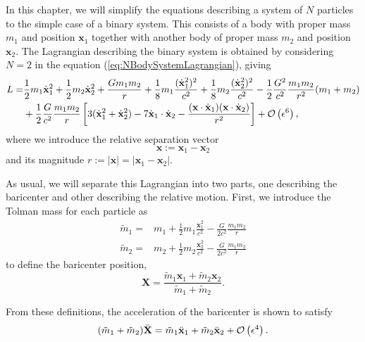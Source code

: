 In this chapter, we will simplify the equations describing a system of $N$ particles to the simple case of a binary system. This consists of a body with proper mass $m_1$ and position $\textbf{x}_1$ together with another body of proper mass $m_2$ and position $\textbf{x}_2$. The Lagrangian describing the binary system is obtained by considering $N=2$ in the equation (\ref{eq:NBodySystemLagrangian}), giving 
\begin{align}
L = &\frac{1}{2} m_1 \dot{\textbf{x}}_1^2 + \frac{1}{2} m_2 \dot{\textbf{x}}_2^2 + \frac{G m_1 m_2}{r} + \frac{1}{8} m_1 \frac{(\dot{\textbf{x}}_1^2)^2}{c^2} + \frac{1}{8} m_2 \frac{(\dot{\textbf{x}}_2^2)^2}{c^2} - \frac{1}{2} \frac{G^2}{c^2} \frac{m_1 m _2}{r^2} (m_1 + m_2) \notag \\
& + \frac{1}{2} \frac{G}{c^2} \frac{m_1 m_2}{r} \left[ 3 (\dot{\textbf{x}}_1^2+ \dot{\textbf{x}}_2^2) - 7 \dot{\textbf{x}}_1 \cdot \dot{\textbf{x}}_2 - \frac{(\textbf{x} \cdot \dot{\textbf{x}}_1) (\textbf{x} \cdot \dot{\textbf{x}}_2)}{r^2} \right]  + {\mathcal{O}} \left( \epsilon^6 \right), \label{eq:PN2BodyLagrangian1}
\end{align}
where we introduce the relative separation vector 
\begin{equation}
\textbf{x} := \textbf{x}_1 - \textbf{x}_2 \label{eq:PN2BodyRelativePosition}
\end{equation}
and its magnitude $r := \left| \textbf{x} \right| = \left| \textbf{x}_1 - \textbf{x}_2 \right|  $.

As usual, we will separate this Lagrangian into two parts, one describing the baricenter and other describing the relative motion. First, we introduce the Tolman mass for each particle as
\begin{align}
\tilde{m}_1 = & m_1 + \frac{1}{2} m_1 \frac{\dot{\textbf{x}}_1^2}{c^2} - \frac{G}{2c^2} \frac{m_1 m_2}{r} \\
\tilde{m}_2 = & m_2 + \frac{1}{2} m_2 \frac{\dot{\textbf{x}}_2^2}{c^2} - \frac{G}{2c^2} \frac{m_1 m_2}{r} 
\end{align}
to define the baricenter position,
\begin{equation}
\textbf{X} = \frac{\tilde{m}_1 \textbf{x}_1 + \tilde{m}_2 \textbf{x}_2}{\tilde{m}_1 + \tilde{m}_2}. \label{eq:PN2BodyBaricenter}
\end{equation}

From these definitions, the acceleration of the baricenter is shown to satisfy
\begin{equation}
(\tilde{m}_1 + \tilde{m}_2) \ddot{\textbf{X}} = \tilde{m}_1 \ddot{\textbf{x}}_1 + \tilde{m}_2 \ddot{\textbf{x}}_2 + {\mathcal{O}} \left( \epsilon^4 \right).
\end{equation}

